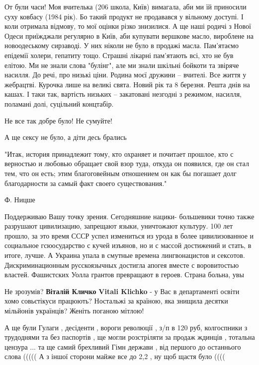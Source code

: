 \begin{itemize}
От були часи! Моя вчителька (206 школа, Київ) вимагала, аби ми їй приносили
суху ковбасу (1984 рік). Бо такий продукт не продавався у вільному доступі. І
коли отримала відмову, то мої оцінки різко знизилися. А ще наші родичі з Нової
Одеси приїжджали регулярно в Київ, аби купувати вершкове масло, вироблене на
новоодеському сирзаводі. У них ніколи не було в продажі масла. Пам'ятаємо
епідемії холери, гепатиту тощо. Страшні лікарні пам'ятають всі, хто не був
елітою. Ми не знали слова "булінг", але ми знали шкільні бойкоти та звіряче
насилля. До речі, про низькі ціни. Родина моєї дружини – вчителі. Все життя у
жебрацтві. Курочка лише на великі свята. Новий рік та 8 березня. Решта днів на
кашах. І таки так, вартість низьких – закатовані незгодні з режимом, насилля,
поламані долі, суцільний концтабір.

Не все так добре було! Не сумуйте!

А ще сексу не було, а діти десь брались


"Итак, история принадлежит тому, кто охраняет и почитает прошлое, кто с
верностью и любовью обращает свой взор туда, откуда он появился, где он стал
тем, что он есть; этим благоговейным отношением он как бы погашает долг
благодарности за самый факт своего существования."

Ф. Ницше


Поддерживаю Вашу точку зрения. Сегодняшние нацики- большевики точно также
разрушают цивилизацию, запрещают языки, уничтожают культуру. 100 лет прошло, за
это время СССР успел измениться из урода в более цивилизованное и социальное
гсюосударство с кучей изъянов, но и с массой достижений и стать, в итоге,
лучше. А Украина упала в смутные времена лингвонацистов и сексотов.
Дискриминационным русскоязычных достигла апогея вместе с воровитостью властей.
Фашистских Уолла грантов превращают в героев. Страна больна, увы

Не зрозумів? \textbf{Віталій Кличко} \textbf{Vitali Klichko} - у Вас в департаменті освіти хомо совьєтікуси працюють? Ностальжі за країною, яка знищила десятки мільйонів українців? Женіть поганою мітлою!

А ще були Гулаги , десіденти , вороги революції , з/п в 120 руб, колгоспники з трудоднями та без паспортів , ще могли розстріляти за продаж ждинців , тотальна цензура ... та ще самий брехливий Гімн держави , від першого до останнього слова (((((
А з іншої сторони майже все до 2,2 , ну щоб щастя було ((((


\end{itemize}
